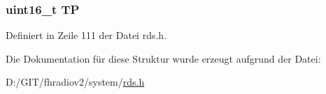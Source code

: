 \subsubsection[{T\+P}]{\setlength{\rightskip}{0pt plus 5cm}uint16\+\_\+t T\+P}\label{structgroup__2b_ab9e634c63b0d95a96716d5f6d7f06d72}


Definiert in Zeile 111 der Datei rds.\+h.



Die Dokumentation für diese Struktur wurde erzeugt aufgrund der Datei\+:\begin{DoxyCompactItemize}
\item 
D\+:/\+G\+I\+T/fhradiov2/system/\hyperlink{rds_8h}{rds.\+h}\end{DoxyCompactItemize}
